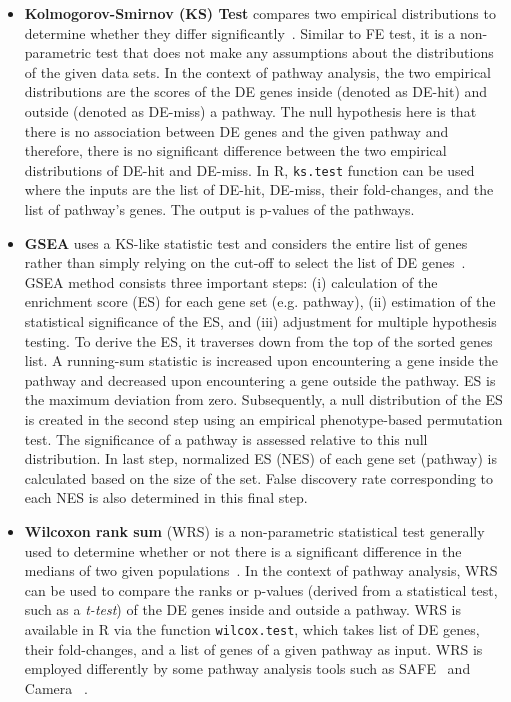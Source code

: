 \begin{itemize}

\item \textbf{Kolmogorov-Smirnov (KS) Test} compares two empirical distributions to determine whether they differ significantly~\cite{wilcoxon1945individual}.
Similar to FE test, it is a non-parametric test that does not make any assumptions about the distributions of the given data sets.
In the context of pathway analysis, the two empirical distributions are the scores of the DE genes inside (denoted as DE-hit) and outside (denoted as DE-miss) a pathway.
The null hypothesis here is that there is no association between DE genes and the given pathway and therefore, there is no significant difference between the two empirical distributions of DE-hit and DE-miss.
In R, \texttt{ks.test} function can be used where the inputs are the list of DE-hit, DE-miss, their fold-changes, and the list of pathway's genes.
The output is p-values of the pathways.

\item \textbf{GSEA} uses a KS-like statistic test and considers the entire list of genes rather than simply relying on the cut-off to select the list of DE genes~\cite{Subramanian:2005}. 
GSEA method consists three important steps: (i) calculation of the enrichment score (ES) for each gene set (e.g. pathway), (ii) estimation of the statistical significance of the ES, and (iii) adjustment for multiple hypothesis testing.
To derive the ES, it traverses down from the top of the sorted genes list.
A running-sum statistic is increased upon encountering a gene inside the pathway and decreased upon encountering a gene outside the pathway. 
ES is the maximum deviation from zero.
Subsequently, a null distribution of the ES is created in the second step using an empirical phenotype-based permutation test.
The significance of a pathway is assessed relative to this null distribution.
In last step, normalized ES (NES) of each gene set (pathway) is calculated based on the size of the set.
False discovery rate corresponding to each NES is also determined in this final step.

\item  \textbf{Wilcoxon rank sum} (WRS) is a non-parametric statistical test generally used to determine whether or not there is a significant difference in the medians of two given populations~\cite{wilcoxon1945individual}.
In the context of pathway analysis, WRS can be used to compare the ranks or p-values (derived from a statistical test, such as a \textit{t-test}) of the DE genes inside and outside a pathway.
WRS is available in R via the function \texttt{wilcox.test}, which takes list of DE genes, their fold-changes, and a list of genes of a given pathway as input.
WRS is employed differently by some pathway analysis tools such as SAFE~\cite{Barry:2005} and Camera ~\cite{wu2012camera}.



\end{itemize}

